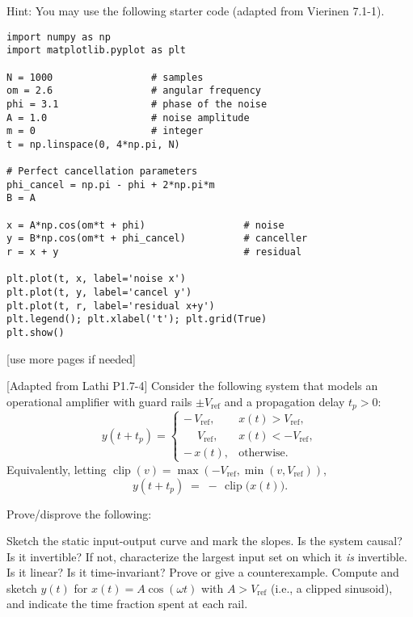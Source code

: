 \documentclass{ee102_pset}
\begin{document}
Hint: You may use the following starter code (adapted from Vierinen 7.1-1).

\begin{lstlisting}[style=py,caption={Starter code for Part (d)},label=lst:noise-cancel]
import numpy as np
import matplotlib.pyplot as plt

N = 1000                 # samples
om = 2.6                 # angular frequency
phi = 3.1                # phase of the noise
A = 1.0                  # noise amplitude
m = 0                    # integer
t = np.linspace(0, 4*np.pi, N)

# Perfect cancellation parameters
phi_cancel = np.pi - phi + 2*np.pi*m
B = A

x = A*np.cos(om*t + phi)                 # noise
y = B*np.cos(om*t + phi_cancel)          # canceller
r = x + y                                # residual

plt.plot(t, x, label='noise x')
plt.plot(t, y, label='cancel y')
plt.plot(t, r, label='residual x+y')
plt.legend(); plt.xlabel('t'); plt.grid(True)
plt.show()
\end{lstlisting}


\vspace*{\fill}
\begin{center}
[use more pages if needed]
\end{center}
 [Adapted from Lathi P1.7-4] Consider the following system that models an operational amplifier with guard rails $\pm V_{\text{ref}}$ and a propagation delay $t_p>0$:
\[
y(t+t_p)=
\begin{cases}
-\,V_{\text{ref}}, & x(t)> V_{\text{ref}},\\[2pt]
\phantom{-}V_{\text{ref}}, & x(t)<-V_{\text{ref}},\\[2pt]
-\,x(t), & \text{otherwise}.
\end{cases}
\]
Equivalently, letting $\operatorname{clip}(v)=\max(-V_{\text{ref}},\min(v,V_{\text{ref}}))$,
\[
y(t+t_p) \;=\; -\,\operatorname{clip}\big(x(t)\big).
\]

Prove/disprove the following:

\problempart Sketch the static input-output curve and mark the slopes.
\problempart Is the system causal?
\problempart Is it invertible? If not, characterize the largest input set on which it \emph{is} invertible.
\problempart Is it linear? 
\problempart Is it time-invariant? Prove or give a counterexample.
\problempart Compute and sketch $y(t)$ for $x(t)=A\cos(\omega t)$ with $A>V_{\text{ref}}$ (i.e., a clipped sinusoid), and indicate the time fraction spent at each rail.
\end{document}
